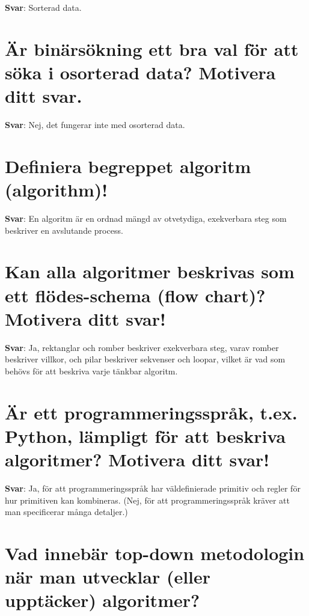 \documentclass[a4paper,11pt,oneside]{book}
\begin{document}
\begin{sloppypar}
\label{q:184:sa:sv:True}

\textbf{Svar}: Sorterad data.



\section{\"Ar bin\"ars\"okning ett bra val f\"or att s\"oka i osorterad data? Motivera ditt svar.}

\label{q:185:sa:sv:True}

\textbf{Svar}: Nej, det fungerar inte med osorterad data.



\section{Definiera begreppet algoritm (algorithm)!}

\label{q:186:sa:sv:True}

\textbf{Svar}: En algoritm \"ar en ordnad m\"angd av otvetydiga, exekverbara steg som beskriver en avslutande process.



\section{Kan alla algoritmer beskrivas som ett fl\"odes-schema (flow chart)? Motivera ditt svar!}

\label{q:187:sa:sv:True}

\textbf{Svar}: Ja, rektanglar och romber beskriver exekverbara steg, varav romber beskriver villkor, och pilar beskriver sekvenser och loopar, vilket \"ar vad som beh\"ovs f\"or att beskriva varje t\"ankbar algoritm.



\section{\"Ar ett programmeringsspr\r{a}k, t.ex. Python, l\"ampligt f\"or att beskriva algoritmer? Motivera ditt svar!}

\label{q:188:sa:sv:True}

\textbf{Svar}: Ja, f\"or att programmeringsspr\r{a}k har v\"aldefinierade primitiv och regler f\"or hur primitiven kan kombineras. (Nej, f\"or att programmeringsspr\r{a}k kr\"aver att man specificerar m\r{a}nga detaljer.)



\section{Vad inneb\"ar top-down metodologin n\"ar man utvecklar (eller uppt\"acker) algoritmer?}


\end{sloppypar}
\end{document}
